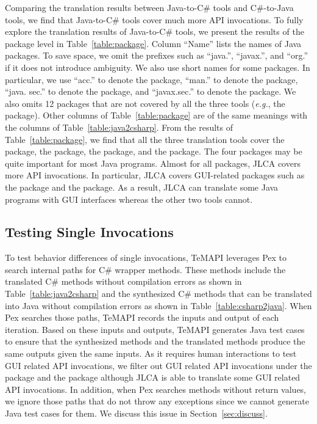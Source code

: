 Comparing the translation results between Java-to-C\# tools and C\#-to-Java tools, we find that Java-to-C\# tools cover much more API invocations. To fully explore the translation results of Java-to-C\# tools, we present the results of the package level in Table~\ref{table:package}. Column ``Name'' lists the names of Java packages. To save space, we omit the prefixes such as ``java.'', ``javax.'', and ``org.'' if it does not introduce ambiguity. We also use short names for some packages. In particular, we use ``acc.'' to denote the  package, ``man.'' to denote the  package, ``java. sec.'' to denote the  package, and ``javax.sec.'' to denote the  package. We also omits 12 packages that are not covered by all the three tools (\emph{e.g.}, the  package). Other columns of Table~\ref{table:package} are of the same meanings with the columns of Table~\ref{table:java2csharp}. From the results of Table~\ref{table:package}, we find that all the three translation tools cover the  package, the  package, the  package, and the  package. The four packages may be quite important for most Java programs. Almost for all packages, JLCA covers more API invocations. In particular, JLCA covers GUI-related packages such as the  package and the  package. As a result, JLCA can translate some Java programs with GUI interfaces whereas the other two tools cannot.

\subsection{Testing Single Invocations}
\label{sec:evaluation:single}


To test behavior differences of single invocations, TeMAPI leverages Pex to search internal paths for C\# wrapper methods. These methods include the translated C\# methods without compilation errors as shown in Table~\ref{table:java2csharp} and the synthesized C\# methods that can be translated into Java without compilation errors as shown in Table~\ref{table:csharp2java}. When Pex searches those paths, TeMAPI records the inputs and output of each iteration. Based on these inputs and outputs, TeMAPI generates Java test cases to ensure that the synthesized methods and the translated methods produce the same outputs given the same inputs. As it requires human interactions to test GUI related API invocations, we filter out GUI related API invocations under the  package and the  package although JLCA is able to translate some GUI related API invocations. In addition, when Pex searches methods without return values, we ignore those paths that do not throw any exceptions since we cannot generate Java test cases for them. We discuss this issue in Section~\ref{sec:discuss}.



